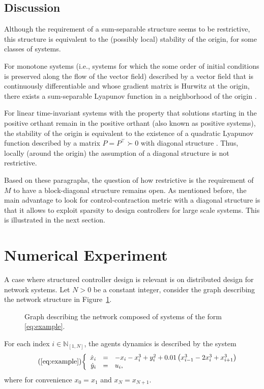 \documentclass[10pt,twocolumn,twoside]{IEEEtran}
\theoremstyle{plain}
\theoremstyle{definition}
\theoremstyle{remark}
\begin{document}
\subsection{Discussion}

Although the requirement of a sum-separable structure seems to be restrictive, this structure is equivalent to the (possibly local) stability of the origin, for some classes of systems.

For monotone systems (i.e., systems for which the some order of initial conditions is preserved along the flow of the vector field) described by a vector field that is continuously differentiable and whose gradient matrix is Hurwitz at the origin, there exists a sum-separable Lyapunov function in a neighborhood of the origin \cite[Theorem 3.4]{Dirr2015}. 

For linear time-invariant systems with the property that solutions starting in the positive orthant remain in the positive orthant (also known as positive systems), the stability of the origin is equivalent to the existence of a quadratic Lyapunov function described by a matrix $P=P^\top\succ0$ with diagonal structure \cite{Tanaka2011}. Thus, locally (around the origin) the assumption of a diagonal structure is not restrictive.


Based on these paragraphs, the question of how restrictive is the requirement of $M$ to have a block-diagonal structure remains open. As mentioned before, the main advantage to look for control-contraction metric with a diagonal structure is that it allows to exploit sparsity to design controllers for large scale systems. This is illustrated in the next section.

\section{Numerical Experiment}\label{sec:Illustration}


A case where structured controller design is relevant is on distributed design for network systems. Let $N>0$ be a constant integer, consider the graph describing the network structure in Figure~\ref{fig:graph}.
\begin{figure}[htpb!]
	\centering
	
	\caption{Graph describing the network composed of systems of the form \eqref{eq:example}.}
	\label{fig:graph}
\end{figure}
For each index $i\in\mathbb{N}_{[1,N]}$, the agents dynamics is described by the system
\begin{equation}\tag{\ref{eq:example}}
	\scalebox{0.95}{$\left\{\begin{array}{rcl}
		\dot{x}_i&=&-x_i-x_i^3+y_i^2 + 0.01\left(x_{i-1}^3 - 2x_i^3 +x_{i+1}^3\right)\\
		\dot{y}_i&=&u_i,
	\end{array}\right.$}
\end{equation}
where for convenience $x_0=x_1$ and $x_N=x_{N+1}$.
\end{document}
